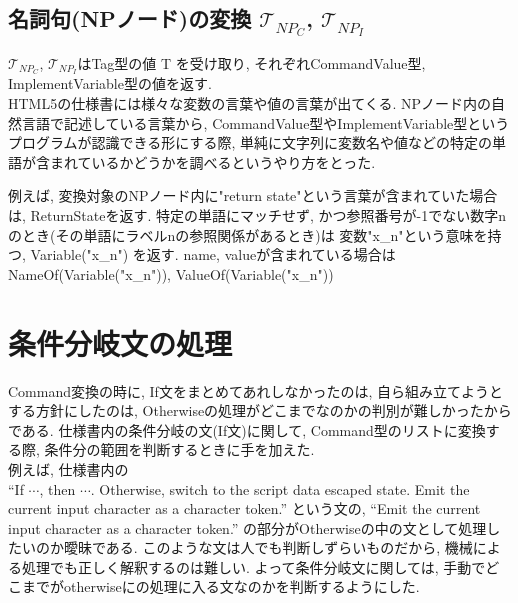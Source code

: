 \documentclass[uplatex,a4j]{jsreport}
\begin{document}
    
\subsection{名詞句(NPノード)の変換 $\mathcal{T}_{NP_C}$, $\mathcal{T}_{NP_I}$}
$\mathcal{T}_{NP_C}$, $\mathcal{T}_{NP_I}$はTag型の値 T を受け取り, それぞれCommandValue型, ImplementVariable型の値を返す. \\
HTML5の仕様書には様々な変数の言葉や値の言葉が出てくる. 
NPノード内の自然言語で記述している言葉から, CommandValue型やImplementVariable型というプログラムが認識できる形にする際, 
単純に文字列に変数名や値などの特定の単語が含まれているかどうかを調べるというやり方をとった. 

例えば, 変換対象のNPノード内に"return state"という言葉が含まれていた場合は, ReturnStateを返す. 
特定の単語にマッチせず, かつ参照番号が-1でない数字nのとき(その単語にラベルnの参照関係があるとき)は 変数"x\_n"という意味を持つ, Variable("x\_n") を返す.
      name, valueが含まれている場合はNameOf(Variable("x\_n")), ValueOf(Variable("x\_n"))

\section{条件分岐文の処理}
Command変換の時に, If文をまとめてあれしなかったのは, 
自ら組み立てようとする方針にしたのは, Otherwiseの処理がどこまでなのかの判別が難しかったからである.
仕様書内の条件分岐の文(If文)に関して, Command型のリストに変換する際, 条件分の範囲を判断するときに手を加えた.\\
例えば, 仕様書内の\\
``If $\cdots$, then $\cdots$. Otherwise, switch to the script data escaped state. Emit the current input character as a character token.''
という文の, ``Emit the current input character as a character token.'' の部分がOtherwiseの中の文として処理したいのか曖昧である. 
このような文は人でも判断しずらいものだから, 機械による処理でも正しく解釈するのは難しい.
よって条件分岐文に関しては, 手動でどこまでがotherwiseにの処理に入る文なのかを判断するようにした. 
\end{document}
